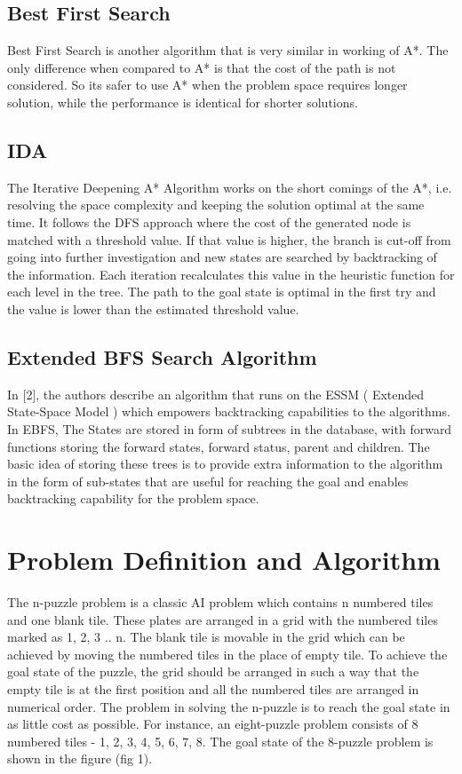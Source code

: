 \documentclass{svproc}
\begin{document}
\subsection{Best First Search}
 Best First Search is another algorithm that is very similar in working of A*. The only difference when compared to A* is that the cost of the path is not considered. So its safer to use A* when the problem space requires longer  solution, while the performance is identical for shorter solutions.
\subsection{IDA} 
The Iterative Deepening A* Algorithm works on the short comings of the A*, i.e. resolving the space complexity and keeping the solution optimal at the same time. It follows the DFS approach where the cost of the generated node is matched with a threshold value. If that value is higher, the branch is cut-off from going into further investigation and new states are searched by backtracking of the information. Each iteration recalculates this value in the heuristic function for each level in the tree. The path to the goal state is optimal in the first try and the value is lower than the estimated threshold value.
\subsection{Extended BFS Search Algorithm}



In [2], the authors describe an algorithm that runs on the ESSM ( Extended State-Space Model ) which empowers backtracking capabilities to the algorithms. In EBFS, The States are stored in form of subtrees in the database, with forward functions storing the forward states, forward status, parent and children. The basic idea of storing these trees is to provide extra information to the algorithm in the form of sub-states that are useful for reaching the goal and enables backtracking capability for the problem space.


\section{Problem Definition and Algorithm}
The n-puzzle problem is a classic AI problem which contains n numbered tiles and one blank tile. These plates are arranged in a grid with the numbered tiles marked as 1, 2, 3 .. n. The blank tile is movable in the grid which can be achieved by moving the numbered tiles in the place of empty tile. To achieve the goal state of the puzzle, the grid should be arranged in such a way that the empty tile is at the first position and all the numbered tiles are arranged in numerical order. The problem in solving the n-puzzle is to reach the goal state in as little cost as possible. For instance, an eight-puzzle problem consists of 8 numbered tiles - 1, 2, 3, 4, 5, 6, 7, 8. The goal state of the 8-puzzle problem is shown in the figure (fig 1). \\
\end{document}

